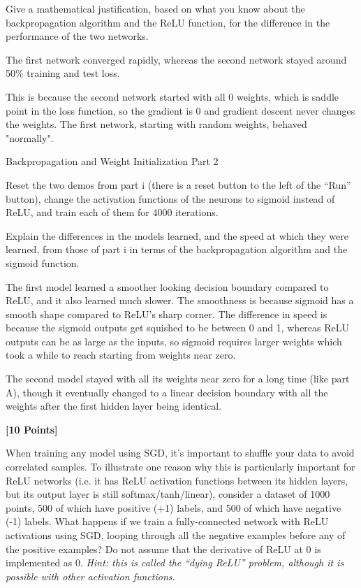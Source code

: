 Give a mathematical justification, based on what you know about the backpropagation algorithm and the ReLU function, for the difference in the performance of the two networks.

\begin{subsolution}
  The first network converged rapidly, whereas the second network stayed around 50\% training and test loss.

  This is because the second network started with all 0 weights, which is saddle point in the loss function, so the gradient is 0 and gradient descent never changes the weights.
  The first network, starting with random weights, behaved "normally".
\end{subsolution}

\begin{problem}[5]
  Backpropagation and Weight Initialization Part 2
\end{problem}
Reset the two demos from part i (there is a reset button to the left of the ``Run'' button), change the activation functions of the neurons to sigmoid instead of ReLU, and train each of them for 4000 iterations.

Explain the differences in the models learned, and the speed at which they were learned, from those of part i in terms of the backpropagation algorithm and the sigmoid function.



\begin{subsolution}
  The first model learned a smoother looking decision boundary compared to ReLU, and it also learned much slower.
  The smoothness is because sigmoid has a smooth shape compared to ReLU's sharp corner.
  The difference in speed is because the sigmoid outputs get squished to be between 0 and 1, whereas ReLU outputs can be as large as the inputs, so sigmoid requires larger weights which took a while to reach starting from weights near zero.

  The second model stayed with all its weights near zero for a long time (like part A), though it eventually changed to a linear decision boundary with all the weights after the first hidden layer being identical.
\end{subsolution}



\problem \textbf{[10 Points]}

When training any model using SGD, it's important to shuffle your data to avoid correlated samples. To illustrate one reason why this is particularly important for ReLU networks (i.e. it has ReLU activation functions between its hidden layers, but its output layer is still softmax/tanh/linear), consider a dataset of 1000 points, 500 of which have positive (+1) labels, and 500 of which have negative (-1) labels. What happens if we train a fully-connected network with ReLU activations using SGD, looping through all the negative examples before any of the positive examples? Do not assume that the derivative of ReLU at 0 is implemented as 0. \textit{Hint: this is called the ``dying ReLU'' problem, although it is possible with other activation functions.}

